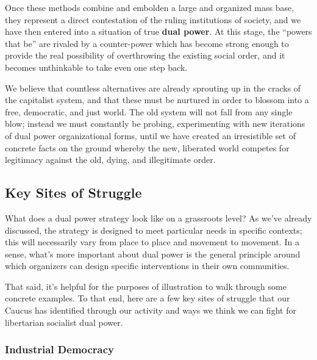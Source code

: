 \documentclass[10pt]{memoir}
\begin{document}
Once these methods combine and embolden a large and organized mass base,
they represent a direct contestation of the ruling institutions of
society, and we have then entered into a situation of true \textbf{dual
power}. At this stage, the ``powers that be'' are rivaled by a
counter-power which has become strong enough to provide the real
possibility of overthrowing the existing social order, and it becomes
unthinkable to take even one step back.

We believe that countless alternatives are already sprouting up in the
cracks of the capitalist system, and that these must be nurtured in
order to blossom into a free, democratic, and just world. The old system
will not fall from any single blow; instead we must constantly be
probing, experimenting with new iterations of dual power organizational
forms, until we have created an irresistible set of concrete facts on
the ground whereby the new, liberated world competes for legitimacy
against the old, dying, and illegitimate order.

\subsection{Key Sites of Struggle}\label{key-sites-of-struggle}

What does a dual power strategy look like on a grassroots level? As
we've already discussed, the strategy is designed to meet particular
needs in specific contexts; this will necessarily vary from place to
place and movement to movement. In a sense, what's more important about
dual power is the general principle around which organizers can design
specific interventions in their own communities.

That said, it's helpful for the purposes of illustration to walk through
some concrete examples. To that end, here are a few key sites of
struggle that our Caucus has identified through our activity and ways we
think we can fight for libertarian socialist dual power.

\subsubsection{Industrial Democracy}\label{industrial-democracy}
\end{document}
